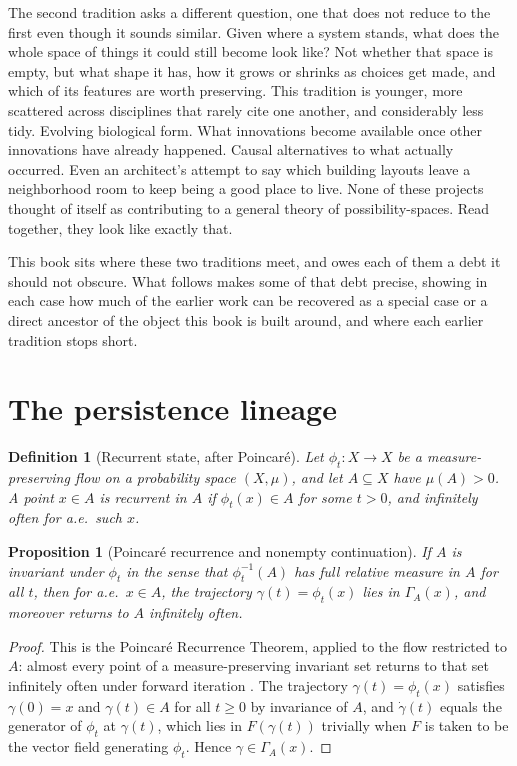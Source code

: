 \documentclass[11pt]{report}
\newtheorem{proposition}{Proposition}[chapter]
\newtheorem{definition}{Definition}[chapter]
\begin{document}
The second tradition asks a different question, one that does not
reduce to the first even though it sounds similar. Given where a system
stands, what does the whole space of things it could still become look
like? Not whether that space is empty, but what shape it has, how it
grows or shrinks as choices get made, and which of its features are
worth preserving. This tradition is younger, more scattered across
disciplines that rarely cite one another, and considerably less tidy.
Evolving biological form. What innovations become available once other
innovations have already happened. Causal alternatives to what
actually occurred. Even an architect's attempt to say which building
layouts leave a neighborhood room to keep being a good place to live.
None of these projects thought of itself as contributing to a general
theory of possibility-spaces. Read together, they look like exactly
that.

This book sits where these two traditions meet, and owes each of them a
debt it should not obscure. What follows makes some of that debt
precise, showing in each case how much of the earlier work can be
recovered as a special case or a direct ancestor of the object this
book is built around, and where each earlier tradition stops short.

\section*{The persistence lineage}

\begin{definition}[Recurrent state, after Poincar\'e]
Let $\phi_t : X \to X$ be a measure-preserving flow on a probability
space $(X,\mu)$, and let $A \subseteq X$ have $\mu(A) > 0$. A point
$x \in A$ is recurrent in $A$ if $\phi_t(x) \in A$ for some $t > 0$,
and infinitely often for a.e.\ such $x$.
\end{definition}

\begin{proposition}[Poincar\'e recurrence and nonempty continuation]
If $A$ is invariant under $\phi_t$ in the sense that $\phi_t^{-1}(A)$
has full relative measure in $A$ for all $t$, then for a.e.\ $x \in A$,
the trajectory $\gamma(t) = \phi_t(x)$ lies in $\Gamma_A(x)$, and
moreover returns to $A$ infinitely often.
\end{proposition}
\begin{proof}
This is the Poincar\'e Recurrence Theorem, applied to the flow
restricted to $A$: almost every point of a measure-preserving invariant
set returns to that set infinitely often under forward iteration
\cite{poincare1890}. The trajectory $\gamma(t) = \phi_t(x)$ satisfies
$\gamma(0) = x$ and $\gamma(t) \in A$ for all $t \geq 0$ by invariance
of $A$, and $\dot\gamma(t)$ equals the generator of $\phi_t$ at
$\gamma(t)$, which lies in $F(\gamma(t))$ trivially when $F$ is taken to
be the vector field generating $\phi_t$. Hence $\gamma \in \Gamma_A(x)$.
\end{proof}
\end{document}
